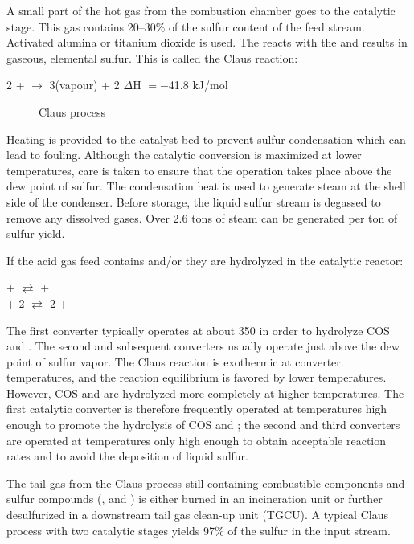 A small part of the hot gas from the combustion chamber goes to the catalytic stage. This gas contains 20--30\% of the sulfur content of the feed stream. Activated alumina or titanium dioxide is used. The  reacts with the  and results in gaseous, elemental sulfur. This is called the Claus reaction:
\begin{center}
2 +  $\longrightarrow$ 3(vapour) + 2 \hspace{5em} $\Delta$H $= -$41.8 kJ/mol
\end{center}

\begin{figure}[t]
\centering
{}
\caption{Claus process \citep{Fahim2010377}}
\label{fig:clauspfd}
\end{figure}
Heating is provided to the catalyst bed to prevent sulfur condensation which can lead to fouling. Although the catalytic conversion is maximized at lower temperatures, care is taken to ensure that the operation takes place above the dew point of sulfur. The condensation heat is used to generate steam at the shell side of the condenser. Before storage, the liquid sulfur stream is degassed to remove any dissolved gases. Over 2.6 tons of steam can be generated per ton of sulfur yield.

If the acid gas feed contains  and/or  they are hydrolyzed in the catalytic reactor:
\begin{center}
 +  $\rightleftarrows$  +  \\
 + 2 $\rightleftarrows$ 2 + 
\end{center}
The first converter typically operates at about 350\textcelsius{} in order to hydrolyze COS and . The second and subsequent converters usually operate just above the dew point of sulfur vapor. The Claus reaction is exothermic at converter temperatures, and the reaction equilibrium is favored by lower temperatures. However, COS and  are hydrolyzed more completely at higher temperatures. The first catalytic converter is therefore frequently operated at temperatures high enough to promote the hydrolysis of COS and ; the second and third converters are operated at temperatures only high enough to obtain acceptable reaction rates and to avoid the deposition of liquid sulfur.

The tail gas from the Claus process still containing combustible components and sulfur compounds (,  and ) is either burned in an incineration unit or further desulfurized in a downstream tail gas clean-up unit (TGCU). A typical Claus process with two catalytic stages yields 97\% of the sulfur in the input stream. 

